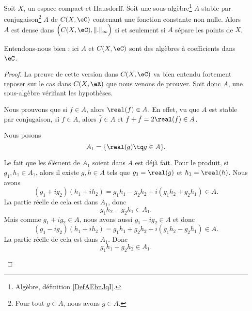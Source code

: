 \begin{theorem} \label{ThoWmAzSMF}
	Soit \( X\), un espace compact et Hausdorff. Soit une sous-algèbre\footnote{Algèbre, définition \ref{DefAEbnJqI}.} \( A\) stable par conjugaison\footnote{Pour tout \( g\in A\), nous avons \( \bar g\in A\).} \( A\) de \( C(X,\eC)\) contenant une fonction constante non nulle. Alors \( A\) est dense dans \( \Big( C(X,\eC),\| . \|_{\infty}\Big)\) si et seulement si \( A\) sépare les points de \(X\).

	Entendons-nous bien : ici \( A\) et \( C(X,\eC)\) sont des algèbres à coefficients dans \( \eC\).
\end{theorem}

\begin{proof}
	La preuve de cette version dans \( C(X,\eC)\) va bien entendu fortement reposer sur le cas dans \( C(X,\eR)\) que nous venons de prouver. Soit donc \( A\), une sous-algèbre vérifiant les hypothèses.
	\begin{subproof}
		Nous prouvons que si \( f\in A\), alors \( \real(f)\in A\). En effet, vu que \( A\) est stable par conjugaison, si \( f\in A\), alors \( \bar f\in A\) et \( f+\bar f=2\real(f)\in A\).
	\end{subproof}
	Nous posons
	\begin{equation}
		A_1=\{ \real(g)\tq g\in A \}.
	\end{equation}
	\begin{subproof}
		Le fait que les élément de \( A_1\) soient dans \( A\) est déjà fait. Pour le produit, si \( g_1,h_1\in A_1\), alors il existe \( g,h\in A\) tels que \( g_1=\real(g)\) et \( h_1=\real(h)\). Nous avons
		\begin{equation}
			(g_1+ig_2)(h_1+ih_2)=g_1h_1-g_2h_2+i(g_1h_2+g_2h_1)\in A.
		\end{equation}
		La partie réelle de cela est dans \( A_1\), donc
		\begin{equation}        \label{EQooYAGUooJVpaEa}
			g_1h_2-g_2h_1\in A_1.
		\end{equation}
		Mais comme \( g_1+ig_2\in A\), nous avons aussi \( g_1-ig_2\in A \) et donc
		\begin{equation}
			(g_1-ig_2)(h_1+ih_2)=g_1h_1+g_2h_2+i(g_1h_2-g_2h_1)\in A.
		\end{equation}
		La partie réelle de cela est dans \( A_1\). Donc
		\begin{equation}
			g_1h_1+g_2h_2\in A_1.
		\end{equation}

\end{subproof}
\end{proof}
